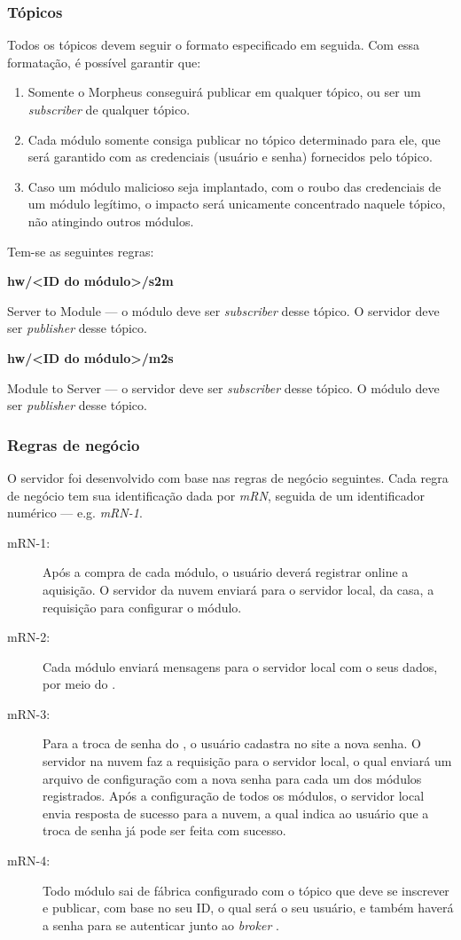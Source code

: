 \subsubsection{Tópicos}
Todos os tópicos devem seguir o formato especificado em seguida. Com essa formatação, é possível garantir que:

\begin{enumerate}
\item Somente o Morpheus conseguirá publicar em qualquer tópico, ou ser um \emph{subscriber} de qualquer tópico.
\item Cada módulo somente consiga publicar no tópico determinado para ele, que será garantido com as credenciais (usuário e senha) fornecidos pelo tópico.
\item Caso um módulo malicioso seja implantado, com o roubo das credenciais de um módulo legítimo, o impacto será unicamente concentrado naquele tópico, não atingindo outros módulos.
\end{enumerate}

Tem-se as seguintes regras:

\textbf{hw/\textless ID do módulo\textgreater /s2m}

Server to Module --- o módulo deve ser \emph{subscriber} desse tópico. O servidor deve ser \emph{publisher} desse tópico.

\textbf{hw/\textless ID do módulo\textgreater /m2s}

Module to Server --- o servidor deve ser \emph{subscriber} desse tópico. O módulo deve ser \emph{publisher} desse tópico.

\subsubsection{Regras de negócio}
O servidor foi desenvolvido com base nas regras de negócio seguintes. Cada regra de negócio tem sua identificação dada por \emph{mRN}, seguida de um identificador numérico --- e.g. \emph{mRN-1}.
\begin{description}
\item[mRN-1:]Após a compra de cada módulo, o usuário deverá registrar online a aquisição. O servidor da nuvem enviará para o servidor local, da casa, a requisição para configurar o módulo.
\item[mRN-2:]Cada módulo enviará mensagens para o servidor local com o seus dados, por meio do \wmqtt{}.
\item[mRN-3:]Para a troca de senha do \wwifi, o usuário cadastra no site a nova senha. O servidor na nuvem faz a requisição para o servidor local, o qual enviará um arquivo de configuração com a nova senha para cada um dos módulos registrados. Após a configuração de todos os módulos, o servidor local envia resposta de sucesso para a nuvem, a qual indica ao usuário que a troca de senha já pode ser feita com sucesso.
\item[mRN-4:]Todo módulo sai de fábrica configurado com o tópico que deve se inscrever e publicar, com base no seu ID, o qual será o seu usuário, e também haverá a senha para se autenticar junto ao \emph{broker} \wmqtt{}.
\end{description}

